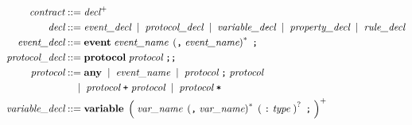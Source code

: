 \documentclass[preview=true]{standalone}
\newcommand{\token}[1]{\textbf{#1}}
\begin{document}
\begin{table}[t]
\newcommand\metasym[1]{{\color{blue}#1}}
\begin{align*}
  \textit{contract} &::= \textit{decl}^+
  \\
  \textit{decl} &::=
    \textit{event\_decl}
    \;\mid\; \textit{protocol\_decl}
    \;\mid\; \textit{variable\_decl}
    \;\mid\; \textit{property\_decl}
    \;\mid\; \textit{rule\_decl}
  \\
  \medskip
  \textit{event\_decl} &::=
    \token{event}\;
      \textit{event\_name}\;
      \left(\texttt{,}\; \textit{event\_name}\right)^\ast\; \texttt{;}
  \\
  \textit{protocol\_decl} &::=
  \token{protocol}\;
   \textit{protocol}\; \texttt{;;}
  \\
  \textit{protocol} &::=
  \token{any}\;
  \mid\;
  \textit{event\_name}\;
  \mid\;
  \textit{protocol}\; \texttt{;}\; \textit{protocol}\;
  \\&\quad
  \mid\;
  \textit{protocol}\; \texttt{+}\; \textit{protocol}\;
  \mid\;
  \textit{protocol}\; \texttt{*}\;
  \\
  \textit{variable\_decl} &::=
  \token{variable}\;
    \left(\;
    \textit{var\_name}\;
    \left(\texttt{,}\; \textit{var\_name}\right)^\ast\;
    \left(\;
    \texttt{:}\; \textit{type}\;
    \right)^?\;
    \texttt{;}\;
    \right)^+
  \\

\end{align*}
\end{table}
\end{document}
